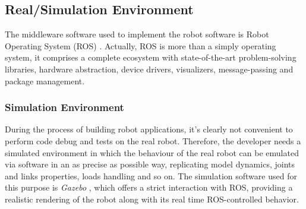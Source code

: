 \subsection{Real/Simulation Environment}
\label{sec:environment}

The middleware software used to implement the robot software is Robot Operating System (ROS) \cite{webros}. Actually, ROS is more than a simply operating system, it comprises a complete ecosystem with state-of-the-art problem-solving libraries, hardware abstraction, device drivers, visualizers, message-passing and package management. 






\subsubsection{Simulation Environment}
During the process of building robot applications, it's clearly not convenient to perform code debug and tests on the real robot. Therefore, the developer needs a simulated environment in which the behaviour of the real robot can be emulated via software in an as precise as possible way, replicating model dynamics, joints and links properties, loads handling and so on. The simulation software used for this purpose is \textit{Gazebo} \cite{webgazebo}, which offers a strict interaction with ROS, providing a realistic rendering of the robot along with its real time ROS-controlled behavior. 

